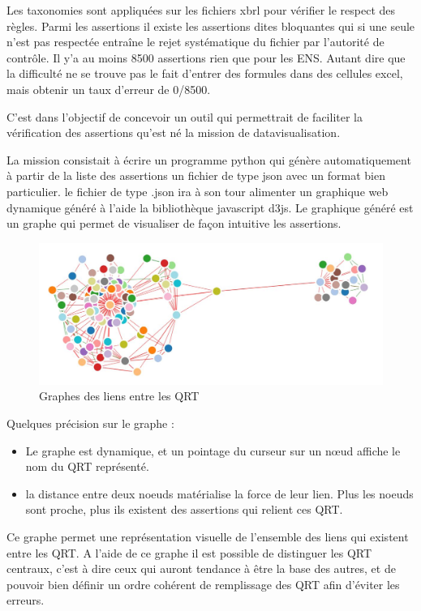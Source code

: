Les taxonomies sont appliquées sur les fichiers xbrl pour vérifier le respect des règles. Parmi les assertions il existe les assertions dites bloquantes qui si une seule n'est pas respectée entraîne le rejet systématique du fichier par l'autorité de contrôle. Il y'a au moins 8500 assertions rien que pour les ENS. Autant dire que la difficulté ne se trouve pas le fait d'entrer des formules dans des cellules excel, mais obtenir un taux d'erreur de 0/8500.

C'est dans l'objectif de concevoir un outil qui permettrait de faciliter la vérification des assertions qu'est né la mission de datavisualisation.

La mission consistait à écrire un programme python qui génère automatiquement à partir de la liste des assertions un fichier de type json avec un format bien particulier. le fichier de type .json ira à son tour alimenter un graphique web dynamique  généré à l'aide la bibliothèque javascript d3js.
Le graphique généré est un graphe qui permet de visualiser de façon intuitive les assertions.

\begin{figure}[H]
\centering
\caption{Graphes des liens entre les QRT}
   \includegraphics[scale=0.5]{img/graph.JPG}
\end{figure}

Quelques précision sur le graphe : 
\begin{itemize}
\item Le graphe est dynamique, et un pointage du curseur sur un  nœud affiche le nom du QRT représenté.
\item la distance entre deux noeuds matérialise la force de leur lien. Plus les noeuds sont proche, plus ils existent des assertions qui relient ces QRT.
\end{itemize}

Ce graphe permet une représentation visuelle de l'ensemble des liens qui existent entre les QRT. A l'aide de ce graphe il est possible de distinguer les QRT centraux, c'est à dire ceux qui auront tendance à être la base des autres, et de pouvoir bien définir un ordre cohérent de remplissage des QRT afin d'éviter les erreurs.




